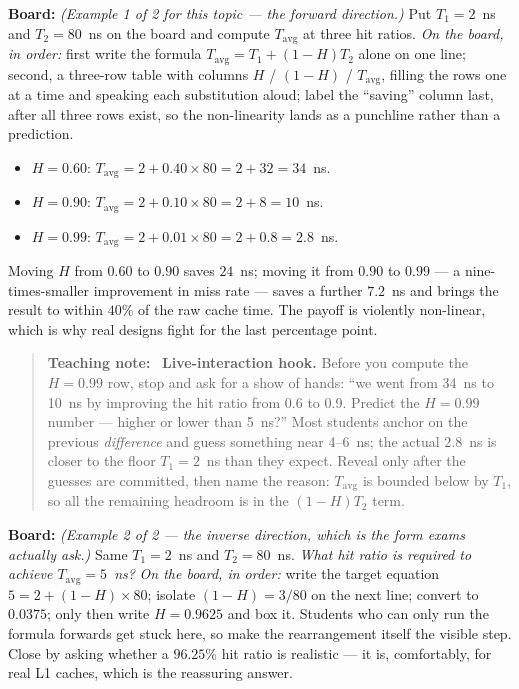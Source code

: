 \documentclass[11pt]{article}
\newenvironment{teachingaside}{\begin{quote}\small\color{primary-gold}\textbf{Teaching note:}\ }{\end{quote}}
\begin{document}
\textbf{Board:} \textit{(Example 1 of 2 for this topic --- the forward direction.)} Put $T_1 = 2$~ns and $T_2 = 80$~ns on the board and compute $T_{\text{avg}}$ at three hit ratios. \emph{On the board, in order:} first write the formula $T_{\text{avg}} = T_1 + (1-H)T_2$ alone on one line; second, a three-row table with columns $H$ / $(1-H)$ / $T_{\text{avg}}$, filling the rows one at a time and speaking each substitution aloud; label the ``saving'' column last, after all three rows exist, so the non-linearity lands as a punchline rather than a prediction.
\begin{itemize}
  \item $H = 0.60$: $T_{\text{avg}} = 2 + 0.40\times 80 = 2 + 32 = 34$~ns.
  \item $H = 0.90$: $T_{\text{avg}} = 2 + 0.10\times 80 = 2 + 8 = 10$~ns.
  \item $H = 0.99$: $T_{\text{avg}} = 2 + 0.01\times 80 = 2 + 0.8 = 2.8$~ns.
\end{itemize}
Moving $H$ from $0.60$ to $0.90$ saves $24$~ns; moving it from $0.90$ to $0.99$ --- a nine-times-smaller improvement in miss rate --- saves a further $7.2$~ns and brings the result to within $40\%$ of the raw cache time. The payoff is violently non-linear, which is why real designs fight for the last percentage point.

\begin{teachingaside}
\textbf{Live-interaction hook.} Before you compute the $H=0.99$ row, stop and ask for a show of hands: ``we went from 34~ns to 10~ns by improving the hit ratio from 0.6 to 0.9. Predict the $H=0.99$ number --- higher or lower than 5~ns?'' Most students anchor on the previous \emph{difference} and guess something near 4--6~ns; the actual $2.8$~ns is closer to the floor $T_1 = 2$~ns than they expect. Reveal only after the guesses are committed, then name the reason: $T_{\text{avg}}$ is bounded below by $T_1$, so all the remaining headroom is in the $(1-H)T_2$ term.
\end{teachingaside}

\textbf{Board:} \textit{(Example 2 of 2 --- the inverse direction, which is the form exams actually ask.)} Same $T_1 = 2$~ns and $T_2 = 80$~ns. \emph{What hit ratio is required to achieve $T_{\text{avg}} = 5$~ns?} \emph{On the board, in order:} write the target equation $5 = 2 + (1-H)\times 80$; isolate $(1-H) = 3/80$ on the next line; convert to $0.0375$; only then write $H = 0.9625$ and box it. Students who can only run the formula forwards get stuck here, so make the rearrangement itself the visible step. Close by asking whether a $96.25\%$ hit ratio is realistic --- it is, comfortably, for real L1 caches, which is the reassuring answer.
\end{document}
